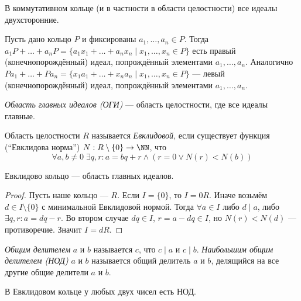 \documentclass[12pt,a4paper]{article}
\begin{document}
    \begin{remark}
        В коммутативном кольце (и в частности в области целостности) все идеалы двухсторонние.
    \end{remark}

    \begin{example}
        Пусть дано кольцо $P$ и фиксированы $a_1, \dots, a_n \in P$. Тогда $a_1 P + \dots + a_n P = \{a_1 x_1 + \dots + a_n x_n \mid x_1, \dots, x_n \in P\}$ есть правый (конечнопорождённый) идеал, попрождённый элементами $a_1, \dots, a_n$. Аналогично $P a_1 + \dots + P a_n = \{x_1 a_1 + \dots + x_n a_n \mid x_1, \dots, x_n \in P\}$ --- левый (конечнопорождённый) идеал, попрождённый элементами $a_1, \dots, a_n$.
    \end{example}

    \begin{definition}
        \emph{Область главных идеалов (ОГИ)} --- область целостности, где все идеалы главные.
    \end{definition}

    \begin{definition}
        Область целостности $R$ называется \emph{Евклидовой}, если существует функция (``Евклидова норма'') $N: R\setminus\{0\} \to \NN$, что
        \[\forall a, b \neq 0\; \exists q, r: a = bq + r \wedge (r = 0 \vee N(r) < N(b))\]
    \end{definition}

    \begin{theorem}
        Евклидово кольцо --- область главных идеалов.
    \end{theorem}

    \begin{proof}
        Пусть наше кольцо --- $R$. Если $I = \{0\}$, то $I = 0R$. Иначе возьмём $d \in I \setminus \{0\}$ с минимальной Евклидовой нормой. Тогда $\forall a \in I$ либо $d \mid a$, либо $\exists q, r: a = dq - r$. Во втором случае $dq \in I$, $r = a - dq \in I$, но $N(r) < N(d)$ --- противоречие. Значит $I = dR$.
    \end{proof}

    \begin{definition}
        \emph{Общим делителем} $a$ и $b$ называется $c$, что $c \mid a$ и $c \mid b$. \emph{Наибольшим общим делителем (НОД)} $a$ и $b$ называется общий делитель $a$ и $b$, делящийся на все другие общие делители $a$ и $b$.
    \end{definition}

    \begin{theorem}
        В Евклидовом кольце у любых двух чисел есть НОД.
    \end{theorem}
\end{document}
